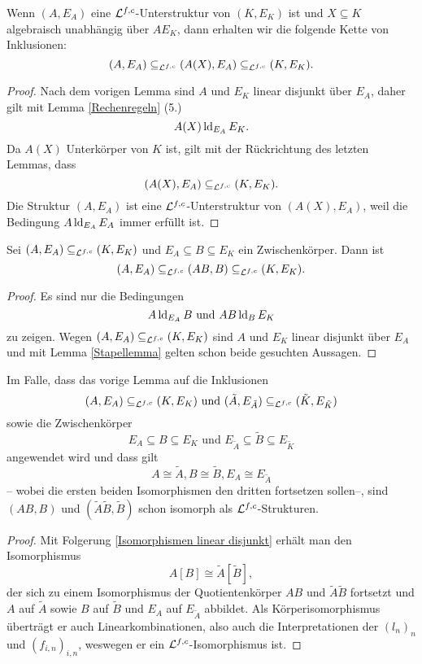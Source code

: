     \begin{lemma}\label{transz Erw}
    	Wenn $(A,E_A)$ eine $\mathcal{L}^{f,c}$-Unterstruktur von $(K,E_K)$ ist und $X\subseteq K$ algebraisch unabhängig über $AE_K$, dann erhalten wir die folgende Kette von Inklusionen: $$(A,E_A)\subseteq_{\mathcal{L}^{f,c}}(A(X),E_A)\subseteq_{\mathcal{L}^{f,c}}(K,E_K).$$
    \end{lemma}
    \begin{proof}
    	Nach dem vorigen Lemma sind $A$ und $E_K$ linear disjunkt über $E_A$, daher gilt mit Lemma \ref{Rechenregeln} (5.) $$A(X)\operatorname{ld}_{E_A}E_K.$$ Da $A(X)$ Unterkörper von $K$ ist, gilt mit der Rückrichtung des letzten Lemmas, dass $$(A(X),E_A)\subseteq_{\mathcal{L}^{f,c}}(K,E_K).$$
    	Die Struktur $(A,E_A)$ ist eine $\mathcal{L}^{f,c}$-Unterstruktur von $(A(X),E_A)$, weil die Bedingung $A\operatorname{ld}_{E_A} E_A$ immer erfüllt ist.
    \end{proof}
    
    \begin{lemma}\label{E-Erw}
    	Sei $(A,E_A)\subseteq_{\mathcal{L}^{f,c}}(K,E_K)$ und $E_A\subseteq B\subseteq E_K$ ein Zwischenkörper. Dann ist $$(A,E_A)\subseteq_{\mathcal{L}^{f,c}}(AB,B)\subseteq_{\mathcal{L}^{f,c}}(K,E_K).$$
    \end{lemma}
    \begin{proof}
    	Es sind nur die Bedingungen $$A\operatorname{ld}_{E_A}B\text{ und }AB\operatorname{ld}_BE_K$$ zu zeigen. Wegen $(A,E_A)\subseteq_{\mathcal{L}^{f,c}}(K,E_K)$ sind $A$ und $E_K$ linear disjunkt über $E_A$ und mit Lemma \ref{Stapellemma} gelten schon beide gesuchten Aussagen.
    \end{proof}
    \newpage
    \begin{lemma}\label{Fortsetzungslemma}
    	Im Falle, dass das vorige Lemma auf die Inklusionen $$(A,E_A)\subseteq_{\mathcal{L}^{f,c}}(K,E_K)\text{ und }(\tilde{A},E_{\tilde{A}})\subseteq_{\mathcal{L}^{f,c}}(\tilde{K},E_{\tilde{K}})$$ sowie die Zwischenkörper $$E_A\subseteq B\subseteq E_K\text{ und }E_{\tilde{A}}\subseteq \tilde{B}\subseteq E_{\tilde{K}}$$ angewendet wird und dass gilt $$A\cong \tilde{A},B\cong \tilde{B},E_A\cong E_{\tilde{A}}$$ \--- wobei die ersten beiden Isomorphismen den dritten fortsetzen sollen\---, sind $(AB,B)$ und $(\tilde{A}\tilde{B},\tilde{B})$ schon isomorph als $\mathcal{L}^{f,c}$-Strukturen.
    \end{lemma}
    \begin{proof}
    	Mit Folgerung \ref{Isomorphismen linear disjunkt} erhält man den Isomorphismus $$A[B]\cong\tilde{A}[\tilde{B}],$$ der sich zu einem Isomorphismus der Quotientenkörper $AB$ und $\tilde{A}\tilde{B}$ fortsetzt und $A$ auf $\tilde{A}$ sowie $B$ auf $\tilde{B}$ und $E_A$ auf $E_{\tilde{A}}$ abbildet. Als Körperisomorphismus überträgt er auch Linearkombinationen, also auch die Interpretationen der $(l_n)_n$ und $(f_{i,n})_{i,n}$, weswegen er ein $\mathcal{L}^{f,c}$-Isomorphismus ist.
    \end{proof}
    
